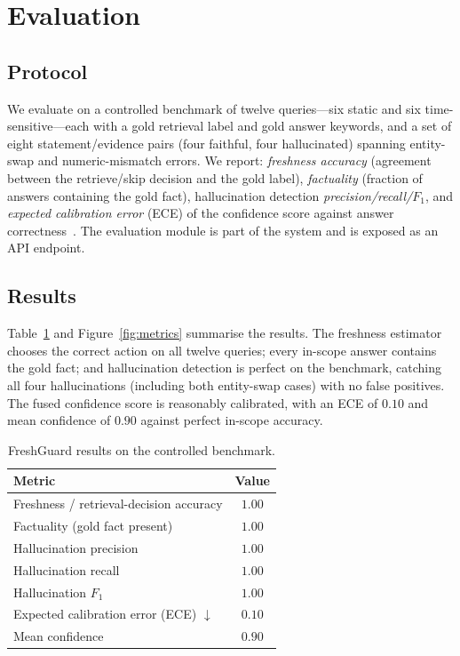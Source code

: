 \documentclass[conference]{IEEEtran}
\begin{document}
\section{Evaluation}
\subsection{Protocol}
We evaluate on a controlled benchmark of twelve queries---six static and six
time-sensitive---each with a gold retrieval label and gold answer keywords, and a set of
eight statement/evidence pairs (four faithful, four hallucinated) spanning entity-swap and
numeric-mismatch errors. We report: \emph{freshness accuracy} (agreement between the
retrieve/skip decision and the gold label), \emph{factuality} (fraction of answers
containing the gold fact), hallucination detection \emph{precision/recall/$F_1$}, and
\emph{expected calibration error} (ECE) of the confidence score against answer
correctness~\cite{guo2017calibration}. The evaluation module is part of the system and is
exposed as an API endpoint.

\subsection{Results}
Table~\ref{tab:results} and Figure~\ref{fig:metrics} summarise the results. The freshness
estimator chooses the correct action on all twelve queries; every in-scope answer contains
the gold fact; and hallucination detection is perfect on the benchmark, catching all four
hallucinations (including both entity-swap cases) with no false positives. The fused
confidence score is reasonably calibrated, with an ECE of $0.10$ and mean confidence of
$0.90$ against perfect in-scope accuracy.

\begin{table}[t]
\caption{FreshGuard results on the controlled benchmark.}
\label{tab:results}
\centering
\begin{tabular}{@{}lc@{}}
\toprule
\textbf{Metric} & \textbf{Value} \\
\midrule
Freshness / retrieval-decision accuracy & $1.00$ \\
Factuality (gold fact present) & $1.00$ \\
Hallucination precision & $1.00$ \\
Hallucination recall & $1.00$ \\
Hallucination $F_1$ & $1.00$ \\
Expected calibration error (ECE) $\downarrow$ & $0.10$ \\
Mean confidence & $0.90$ \\
\bottomrule
\end{tabular}
\end{table}
\end{document}
